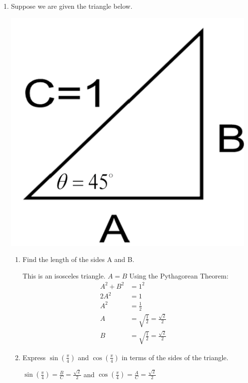 \documentclass[nooutcomes,handout]{ximera}
\begin{document}
\begin{problem}
\begin{enumerate}
	\item Suppose we are given the triangle below.  
		\begin{image}
		\includegraphics[scale=.3]{figure2.png}
		\end{image}

		\begin{enumerate}
	\item Find the length of the sides A and B.
	\begin{freeResponse}
	This is an isosceles triangle. $A=B$  Using the Pythagorean Theorem:
	\begin{align*}
	A^2+B^2&=1^2\\
	2A^2&=1 \\ 	
	A^2&=\frac{1}{2}\\
	A&=\sqrt{\frac{1}{2}}=\frac{\sqrt{2}}{2}\\
	B&=\sqrt{\frac{1}{2}}=\frac{\sqrt{2}}{2}
	\end{align*}
	\end{freeResponse}

	\item Express $\sin\left(\frac{\pi}{4}\right)$ and $\cos\left(\frac{\pi}{4}\right)$ in terms of the sides of the triangle.

	\begin{freeResponse}
	$\sin\left(\frac{\pi}{4}\right)=\frac{B}{C}=\frac{\sqrt{2}}{2}$ and $\cos\left(\frac{\pi}{4}\right)=\frac{A}{C}=\frac{\sqrt{2}}{2}$


\end{freeResponse}
\end{enumerate}
\end{enumerate}
\end{problem}
\end{document}
